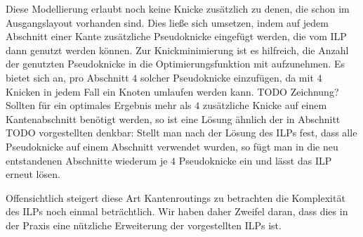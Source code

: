 Diese Modellierung erlaubt noch keine Knicke zusätzlich zu denen, die schon im Ausgangslayout vorhanden sind. Dies ließe sich umsetzen, indem auf jedem Abschnitt einer Kante zusätzliche Pseudoknicke eingefügt werden, die vom ILP dann genutzt werden können. Zur Knickminimierung ist es hilfreich, die Anzahl der genutzten Pseudoknicke in die Optimierungsfunktion mit aufzunehmen. Es bietet sich an, pro Abschnitt $4$ solcher Pseudoknicke einzufügen, da mit $4$ Knicken in jedem Fall ein Knoten umlaufen werden kann. TODO Zeichnung? Sollten für ein optimales Ergebnis mehr als $4$ zusätzliche Knicke auf einem Kantenabschnitt benötigt werden, so ist eine Lösung ähnlich der in Abschnitt TODO vorgestellten denkbar: Stellt man nach der Lösung des ILPs fest, dass alle Pseudoknicke auf einem Abschnitt verwendet wurden, so fügt man in die neu entstandenen Abschnitte wiederum je $4$ Pseudoknicke ein und lässt das ILP erneut lösen.

Offensichtlich steigert diese Art Kantenroutings zu betrachten die Komplexität des ILPs noch einmal beträchtlich. Wir haben daher Zweifel daran, dass dies in der Praxis eine nützliche Erweiterung der vorgestellten ILPs ist.
